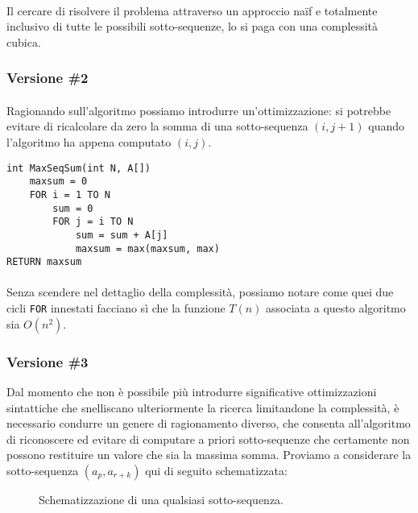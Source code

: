 \documentclass[11pt,a4paper,oneside]{article}
\begin{document}
\paragraph*{}Il cercare di risolvere il problema attraverso un approccio naïf e totalmente inclusivo di tutte le possibili sotto-sequenze, lo si paga con una complessità cubica.

\subsubsection{Versione \#2}
\paragraph*{}Ragionando sull'algoritmo possiamo introdurre un'ottimizzazione: si potrebbe evitare di ricalcolare da zero la somma di una sotto-sequenza $(i, j+1)$ quando l'algoritmo ha appena computato $(i, j)$.

\begin{lstlisting}[caption={Calcolo della massima somma di una sotto-sequenza, versione 2.},label={lst:max_seq_2}]
int MaxSeqSum(int N, A[])
	maxsum = 0
	FOR i = 1 TO N 
		sum = 0
		FOR j = i TO N
			sum = sum + A[j]
			maxsum = max(maxsum, max)
RETURN maxsum
\end{lstlisting}

\paragraph*{}Senza scendere nel dettaglio della complessità, possiamo notare come quei due cicli \texttt{FOR} innestati facciano sì che la funzione $T(n)$ associata a questo algoritmo sia $O(n^2)$.

\subsubsection{Versione \#3} Dal momento che non è possibile più introdurre significative ottimizzazioni sintattiche che snelliscano ulteriormente la ricerca limitandone la complessità, è necessario condurre un genere di ragionamento diverso, che consenta all'algoritmo di riconoscere ed evitare di computare a priori sotto-sequenze che certamente non possono restituire un valore che sia la massima somma. Proviamo a considerare la sotto-sequenza $(a_p, a_{r+k})$ qui di seguito schematizzata: 
\begin{figure}[hb]
	\centering
{}
	\label{fig:arrmaxsum}
	\caption{Schematizzazione di una qualsiasi sotto-sequenza.}
\end{figure}
\end{document}
